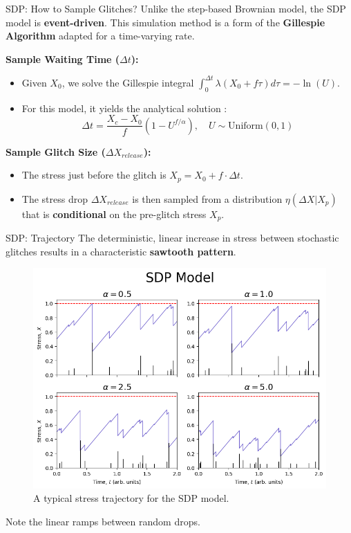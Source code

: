 \begin{frame}{SDP: How to Sample Glitches?}
    Unlike the step-based Brownian model, the SDP model is \textbf{event-driven}. This simulation method is a form of the \textbf{Gillespie Algorithm} adapted for a time-varying rate.

    {\setlength{\leftmargini}{1em}
    \textbf{Sample Waiting Time ($\Delta t$):}
    
    \begin{itemize}
        \item Given $X_0$, we solve the Gillespie integral $\int_0^{\Delta t} \lambda(X_0 + f \tau) d\tau = -\ln(U)$.
        \item For this model, it yields the analytical solution \cite{FulgenziMelatosHughes2017}:
        \begin{equation}
        \Delta t = \frac{X_c - X_0}{f} \left(1 - U^{f/\alpha}\right), \quad U \sim \text{Uniform}(0,1)
        \end{equation}
    \end{itemize}
    
    \textbf{Sample Glitch Size ($\Delta X_{release}$):}
    \begin{itemize}
        \item The stress just before the glitch is $X_p = X_0 + f \cdot \Delta t$.
        \item The stress drop $\Delta X_{release}$ is then sampled from a distribution $\eta(\Delta X | X_p)$ that is \textbf{conditional} on the pre-glitch stress $X_p$.
    \end{itemize}
    }
\end{frame}

\begin{frame}{SDP: Trajectory}
    The deterministic, linear increase in stress between stochastic glitches results in a characteristic \textbf{sawtooth pattern}.

    \begin{figure}
        \centering
        \includegraphics[width=0.75\linewidth,trim=0 0 0 45,clip]{assets/traj_sdp.png}
        \vspace{-1em}
        \caption{A typical stress trajectory for the SDP model. }
    \end{figure}

    Note the linear ramps between random drops.
\end{frame}

